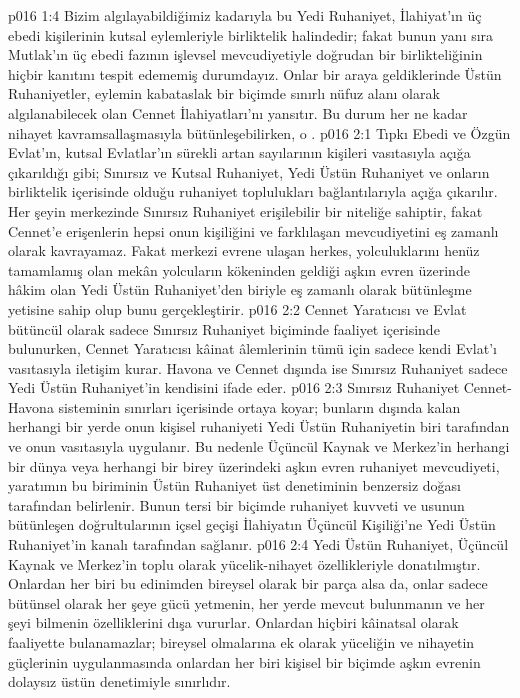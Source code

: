 \vs p016 1:4 Bizim algılayabildiğimiz kadarıyla bu Yedi Ruhaniyet, İlahiyat’ın üç ebedi kişilerinin kutsal eylemleriyle birliktelik halindedir; fakat bunun yanı sıra Mutlak’ın üç ebedi fazının işlevsel mevcudiyetiyle doğrudan bir birlikteliğinin hiçbir kanıtını tespit edememiş durumdayız. Onlar bir araya geldiklerinde Üstün Ruhaniyetler, eylemin kabataslak bir biçimde sınırlı nüfuz alanı olarak algılanabilecek olan Cennet İlahiyatları’nı yansıtır. Bu durum her ne kadar nihayet kavramsallaşmasıyla bütünleşebilirken, o .
\vs p016 2:1 Tıpkı Ebedi ve Özgün Evlat’ın, kutsal Evlatlar’ın sürekli artan sayılarının kişileri vasıtasıyla açığa çıkarıldığı gibi; Sınırsız ve Kutsal Ruhaniyet, Yedi Üstün Ruhaniyet ve onların birliktelik içerisinde olduğu ruhaniyet toplulukları bağlantılarıyla açığa çıkarılır. Her şeyin merkezinde Sınırsız Ruhaniyet erişilebilir bir niteliğe sahiptir, fakat Cennet’e erişenlerin hepsi onun kişiliğini ve farklılaşan mevcudiyetini eş zamanlı olarak kavrayamaz. Fakat merkezi evrene ulaşan herkes, yolculuklarını henüz tamamlamış olan mekân yolcuların kökeninden geldiği aşkın evren üzerinde hâkim olan Yedi Üstün Ruhaniyet’den biriyle eş zamanlı olarak bütünleşme yetisine sahip olup bunu gerçekleştirir.
\vs p016 2:2 Cennet Yaratıcısı ve Evlat bütüncül olarak sadece Sınırsız Ruhaniyet biçiminde faaliyet içerisinde bulunurken, Cennet Yaratıcısı kâinat âlemlerinin tümü için sadece kendi Evlat’ı vasıtasıyla iletişim kurar. Havona ve Cennet dışında ise Sınırsız Ruhaniyet sadece Yedi Üstün Ruhaniyet’in  kendisini ifade eder.
\vs p016 2:3 Sınırsız Ruhaniyet Cennet\hyp{}Havona sisteminin sınırları içerisinde ortaya koyar; bunların dışında kalan herhangi bir yerde onun kişisel ruhaniyeti Yedi Üstün Ruhaniyetin biri tarafından ve onun vasıtasıyla uygulanır. Bu nedenle Üçüncül Kaynak ve Merkez’in herhangi bir dünya veya herhangi bir birey üzerindeki aşkın evren ruhaniyet mevcudiyeti, yaratımın bu biriminin Üstün Ruhaniyet üst denetiminin benzersiz doğası tarafından belirlenir. Bunun tersi bir biçimde ruhaniyet kuvveti ve usunun bütünleşen doğrultularının içsel geçişi İlahiyatın Üçüncül Kişiliği’ne Yedi Üstün Ruhaniyet’in kanalı tarafından sağlanır.
\vs p016 2:4 Yedi Üstün Ruhaniyet, Üçüncül Kaynak ve Merkez’in toplu olarak yücelik\hyp{}nihayet özellikleriyle donatılmıştır. Onlardan her biri bu edinimden bireysel olarak bir parça alsa da, onlar sadece bütünsel olarak her şeye gücü yetmenin, her yerde mevcut bulunmanın ve her şeyi bilmenin özelliklerini dışa vururlar. Onlardan hiçbiri kâinatsal olarak faaliyette bulanamazlar; bireysel olmalarına ek olarak yüceliğin ve nihayetin güçlerinin uygulanmasında onlardan her biri kişisel bir biçimde aşkın evrenin dolaysız üstün denetimiyle sınırlıdır.
